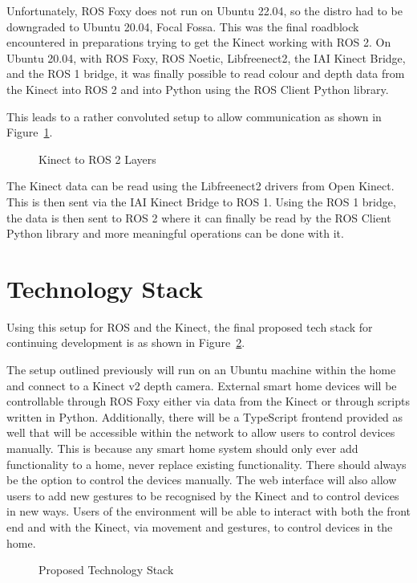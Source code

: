 Unfortunately, ROS Foxy does not run on Ubuntu 22.04, so the distro had to be downgraded to Ubuntu 20.04, Focal Fossa.
This was the final roadblock encountered in preparations trying to get the Kinect working with ROS 2.
On Ubuntu 20.04, with ROS Foxy, ROS Noetic, Libfreenect2, the IAI Kinect Bridge, and the ROS 1 bridge, it was finally possible to read colour and depth data from the Kinect into ROS 2 and into Python using the ROS Client Python library.

This leads to a rather convoluted setup to allow communication as shown in Figure~\ref{fig:kinect_ros}.

\begin{figure}[!htb]
    \caption{Kinect to ROS 2 Layers}
    \label{fig:kinect_ros}
\end{figure}

The Kinect data can be read using the Libfreenect2 drivers from Open Kinect.
This is then sent via the IAI Kinect Bridge to ROS 1.
Using the ROS 1 bridge, the data is then sent to ROS 2 where it can finally be read by the ROS Client Python library and more meaningful operations can be done with it.

\section{Technology Stack}
Using this setup for ROS and the Kinect, the final proposed tech stack for continuing development is as shown in Figure~\ref{fig:tech_stack}.

The setup outlined previously will run on an Ubuntu machine within the home and connect to a Kinect v2 depth camera.
External smart home devices will be controllable through ROS Foxy either via data from the Kinect or through scripts written in Python.
Additionally, there will be a TypeScript frontend provided as well that will be accessible within the network to allow users to control devices manually.
This is because any smart home system should only ever add functionality to a home, never replace existing functionality.
There should always be the option to control the devices manually.
The web interface will also allow users to add new gestures to be recognised by the Kinect and to control devices in new ways.
Users of the environment will be able to interact with both the front end and with the Kinect, via movement and gestures, to control devices in the home.

\begin{figure}[!htb]
    \caption{Proposed Technology Stack}
    \label{fig:tech_stack}
\end{figure}

